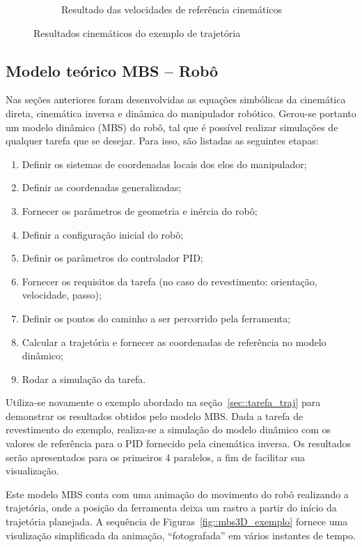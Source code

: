 \begin{figure}[h]
\begin{subfigure}[b]{0.4\textwidth}
        \caption{Resultado das velocidades de referência cinemáticos}
        \label{fig::uxt_exemplo}
    \end{subfigure}
    \caption{Resultados cinemáticos do exemplo de
    trajetória}\label{fig::res_exemplo}
\end{figure}


\subsection{Modelo teórico MBS -- Robô}

Nas seções anteriores foram desenvolvidas as equações simbólicas da
cinemática direta, cinemática inversa e dinâmica do manipulador robótico. 
Gerou-se portanto um modelo dinâmico (MBS) do robô, tal que é
possível realizar simulações de qualquer tarefa que se desejar. Para isso, são
listadas as seguintes etapas:

\begin{enumerate}
  \item Definir os sistemas de coordenadas locais dos elos do manipulador;
  \item Definir as coordenadas generalizadas;
  \item Fornecer os parâmetros de geometria e inércia do robô;
  \item Definir a configuração inicial do robô;
  \item Definir os parâmetros do controlador PID;
  \item Fornecer os requisitos da tarefa (no caso do revestimento: orientação,
  velocidade, passo);
  \item Definir os pontos do caminho a ser percorrido pela ferramenta;
  \item Calcular a trajetória e fornecer as coordenadas de referência no
  modelo dinâmico;
  \item Rodar a simulação da tarefa. 
\end{enumerate}

Utiliza-se novamente o exemplo abordado na seção~\ref{sec::tarefa_traj} para
demonstrar os resultados obtidos pelo modelo MBS. Dada a tarefa de revestimento
do exemplo, realiza-se a simulação do modelo dinâmico com os valores de
referência para o PID fornecido pela cinemática inversa.  Os resultados serão
apresentados para os primeiros 4 paralelos, a fim de facilitar sua visualização.

Este modelo MBS conta com uma animação do movimento
do robô realizando a trajetória, onde a posição da ferramenta deixa um rastro a
partir do início da trajetória planejada. A sequência de
Figuras~\ref{fig::mbs3D_exemplo} fornece uma visulização simplificada da
animação, ``fotografada'' em vários instantes de tempo.

